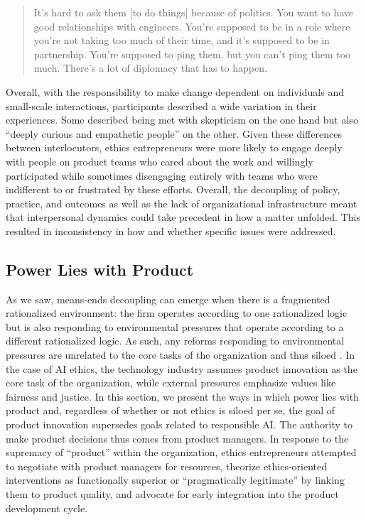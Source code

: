 \documentclass[sigconf]{acmart}
\begin{document}
\begin{quote}
It’s hard to ask them [to do things] because of politics. You want to have good relationships with engineers. You’re supposed to be in a role where you’re not taking too much of their time, and it’s supposed to be in partnership. You’re supposed to ping them, but you can’t ping them too much. There’s a lot of diplomacy that has to happen.
\end{quote}

Overall, with the responsibility to make change dependent on individuals and small-scale interactions, participants described a wide variation in their experiences. Some described being met with skepticism on the one hand but also “deeply curious and empathetic people” on the other. Given these differences between interlocutors, ethics entrepreneurs were more likely to engage deeply with people on product teams who cared about the work and willingly participated while sometimes disengaging entirely with teams who were indifferent to or frustrated by these efforts. Overall, the decoupling of policy, practice, and outcomes as well as the lack of organizational infrastructure meant that interpersonal dynamics could take precedent in how a matter unfolded. This resulted in inconsistency in how and whether specific issues were addressed. 

\subsection{Power Lies with Product}

As we saw, means-ends decoupling can emerge when there is a fragmented rationalized environment: the firm operates according to one rationalized logic but is also responding to environmental pressures that operate according to a different rationalized logic. As such, any reforms responding to environmental pressures are unrelated to the core tasks of the organization and thus siloed \cite{bromley_smoke_2012}. In the case of AI ethics, the technology industry assumes product innovation as the core task of the organization, while external pressures emphasize values like fairness and justice. In this section, we present the ways in which power lies with product and, regardless of whether or not ethics is siloed per se, the goal of product innovation supersedes goals related to responsible AI. The authority to make product decisions thus comes from product managers. In response to the supremacy of “product” within the organization, ethics entrepreneurs attempted to negotiate with product managers for resources, theorize ethics-oriented interventions as functionally superior or “pragmatically legitimate” \cite{greenwood_theorizing_2002} by linking them to product quality, and advocate for early integration into the product development cycle.
\end{document}
